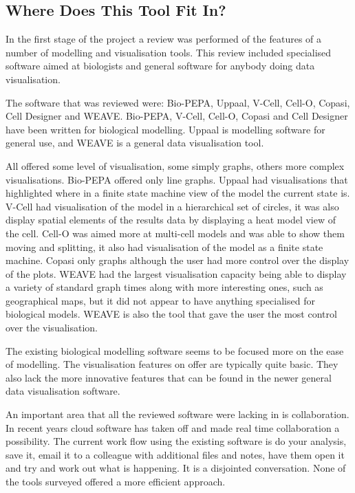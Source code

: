 \subsection{Where Does This Tool Fit In?}

In the first stage of the project a review was performed of the features of a number of modelling and visualisation tools.  This review included specialised software aimed at biologists and general software for anybody doing data visualisation.

The software that was reviewed were: Bio-PEPA, Uppaal, V-Cell, Cell-O, Copasi, Cell Designer and WEAVE.  Bio-PEPA, V-Cell, Cell-O, Copasi and Cell Designer have been written for biological modelling.  Uppaal is modelling software for general use, and WEAVE is a general data visualisation tool.

All offered some level of visualisation, some simply graphs, others more complex visualisations.  Bio-PEPA offered only line graphs.  Uppaal had visualisations that highlighted where in a finite state machine view of the model the current state is.  V-Cell had visualisation of the model in a hierarchical set of circles, it was also display spatial elements of the results data by displaying a heat model view of the cell.  Cell-O was aimed more at multi-cell models and was able to show them moving and splitting, it also had visualisation of the model as a finite state machine.  Copasi only graphs although the user had more control over the display of the plots.  WEAVE had the largest visualisation capacity being able to display a variety of standard graph times along with more interesting ones, such as geographical maps, but it did not appear to have anything specialised for biological models.  WEAVE is also the tool that gave the user the most control over the visualisation.

The existing biological modelling software seems to be focused more on the ease of modelling.  The visualisation features on offer are typically quite basic.  They also lack the more innovative features that can be found in the newer general data visualisation software.

An important area that all the reviewed software were lacking in is collaboration.  In recent years cloud software has taken off and made real time collaboration a possibility.  The current work flow using the existing software is do your analysis, save it, email it to a colleague with additional files and notes, have them open it and try and work out what is happening.  It is a disjointed conversation.  None of the tools surveyed offered a more efficient approach.

